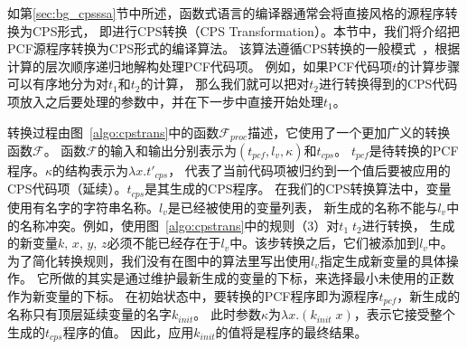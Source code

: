 如第\ref{sec:bg_cpsssa}节中所述，函数式语言的编译器通常会将直接风格的源程序转换为CPS形式，
即进行CPS转换（CPS Transformation）。本节中，我们将介绍把PCF源程序转换为CPS形式的编译算法。
该算法遵循CPS转换的一般模式~\cite{plotkin1975call,danvy2007one}，根据计算的层次顺序递归地解构处理PCF代码项。
例如，如果PCF代码项$t$的计算步骤可以有序地分为对$t_1$和$t_2$的计算，
那么我们就可以把对$t_2$进行转换得到的CPS代码项放入之后要处理的参数中，并在下一步中直接开始处理$t_1$。 

转换过程由图~\ref{algo:cpstrans}中的函数$\mathcal{F}_{proc}$描述，它使用了一个更加广义的转换函数$\mathcal{F}$。
函数$\mathcal{F}$的输入和输出分别表示为$(t_{pcf}, l_v, \kappa)$和$t_{cps}$。
$t_{pcf}$是待转换的PCF程序。$\kappa$的结构表示为$\lambda x. t'_{cps}$，
代表了当前代码项被归约到一个值后要被应用的CPS代码项（延续）。$t_{cps}$是其生成的CPS程序。
在我们的CPS转换算法中，变量使用有名字的字符串名称。$l_v$是已经被使用的变量列表，
新生成的名称不能与$l_v$中的名称冲突。例如，使用图~\ref{algo:cpstrans}中的规则（3）对$t_1\; t_2$进行转换，
生成的新变量$k,\, x,\, y,\, z$必须不能已经存在于$l_v$中。该步转换之后，它们被添加到$l_v$中。
为了简化转换规则，我们没有在图中的算法里写出使用$l_v$指定生成新变量的具体操作。
它所做的其实是通过维护最新生成的变量的下标，来选择最小未使用的正数作为新变量的下标。
在初始状态中，要转换的PCF程序即为源程序$t_{pcf}$，新生成的名称只有顶层延续变量的名字$k_{init}$。
此时参数$\kappa$为$\lambda x. (k_{init}\; x)$，表示它接受整个生成的$t_{cps}$程序的值。
因此，应用$k_{init}$的值将是程序的最终结果。

